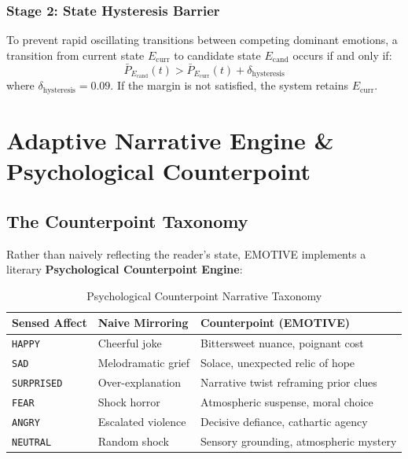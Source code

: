 \documentclass[sigconf,nonacm]{acmart}
\begin{document}
\subsubsection{Stage 2: State Hysteresis Barrier}
To prevent rapid oscillating transitions between competing dominant emotions, a transition from current state $E_{\text{curr}}$ to candidate state $E_{\text{cand}}$ occurs if and only if:
\begin{equation}
\bar{P}_{E_{\text{cand}}}(t) > \bar{P}_{E_{\text{curr}}}(t) + \delta_{\text{hysteresis}}
\end{equation}
where $\delta_{\text{hysteresis}} = 0.09$. If the margin is not satisfied, the system retains $E_{\text{curr}}$.

\section{Adaptive Narrative Engine \& Psychological Counterpoint}

\subsection{The Counterpoint Taxonomy}

Rather than naively reflecting the reader's state, EMOTIVE implements a literary \textbf{Psychological Counterpoint Engine}:

\begin{table}[h]
\centering
\small
\caption{Psychological Counterpoint Narrative Taxonomy}
\begin{tabular}{lll}
\toprule
\textbf{Sensed Affect} & \textbf{Naive Mirroring} & \textbf{Counterpoint (EMOTIVE)} \\
\midrule
\texttt{HAPPY} & Cheerful joke & Bittersweet nuance, poignant cost \\
\texttt{SAD} & Melodramatic grief & Solace, unexpected relic of hope \\
\texttt{SURPRISED} & Over-explanation & Narrative twist reframing prior clues \\
\texttt{FEAR} & Shock horror & Atmospheric suspense, moral choice \\
\texttt{ANGRY} & Escalated violence & Decisive defiance, cathartic agency \\
\texttt{NEUTRAL} & Random shock & Sensory grounding, atmospheric mystery \\
\bottomrule
\end{tabular}
\end{table}
\end{document}
